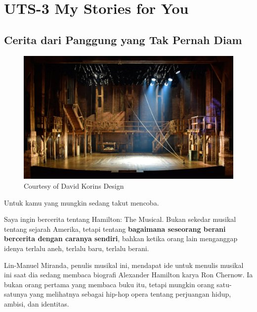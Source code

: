 \documentclass[
  letterpaper,
  DIV=11,
  numbers=noendperiod]{scrreprt}
\begin{document}

\chapter{UTS-3 My Stories for You}\label{uts-3-my-stories-for-you}

\section{Cerita dari Panggung yang Tak Pernah
Diam}\label{cerita-dari-panggung-yang-tak-pernah-diam}

\begin{figure}[H]

{\centering \includegraphics[width=0.95\linewidth,height=\textheight,keepaspectratio]{My_Stories_for_You/../images/hamiltonSet.jpg}

}

\caption{Courtesy of David Korins Design}

\end{figure}%

Untuk kamu yang mungkin sedang takut mencoba.

Saya ingin bercerita tentang Hamilton: The Musical. Bukan sekedar
musikal tentang sejarah Amerika, tetapi tentang \textbf{bagaimana
seseorang berani bercerita dengan caranya sendiri}, bahkan ketika orang
lain menganggap idenya terlalu aneh, terlalu baru, terlalu berani.

Lin-Manuel Miranda, penulis musikal ini, mendapat ide untuk menulis
musikal ini saat dia sedang membaca biografi Alexander Hamilton karya
Ron Chernow. Ia bukan orang pertama yang membaca buku itu, tetapi
mungkin orang satu-satunya yang melihatnya sebagai hip-hop opera tentang
perjuangan hidup, ambisi, dan identitas.
\end{document}
